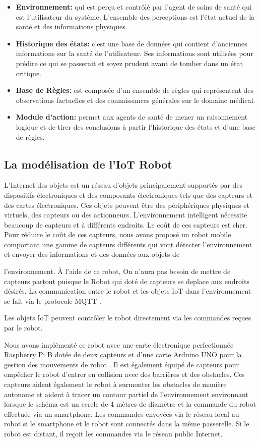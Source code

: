 \begin{itemize}
    \item \textbf{ Environnement:} qui est perçu et contrôlé par l'agent de soins de santé qui est l'utilisateur du système. L'ensemble des perceptions est l'état actuel de la santé et des informations physiques.
    \item \textbf{Historique des états:} c'est une base de données qui contient d'anciennes informations sur la santé de l'utilisateur. Ses informations sont utilisées pour prédire ce qui se passerait et soyez prudent avant de tomber dans un état critique.
    \item \textbf{Base de Règles:} est composée d'un ensemble de règles qui représentent des observations factuelles et  des connaissances générales sur le domaine médical.
    \item \textbf{Module d'action:} permet aux agents de santé de mener un raisonnement logique et de tirer des conclusions à partir l'historique des états  et d'une base de règles.
\end{itemize}
\subsection{La modélisation de l'IoT Robot}
L'Internet des objets\cite{29}\cite{30} est un réseau d'objets principalement supportés par des dispositifs électroniques et des composants électroniques tels que des capteurs et des cartes électroniques. Ces objets peuvent être des périphériques physiques et virtuels, des capteurs ou des actionneurs. L'environnement intelligent nécessite beaucoup de capteurs et à différents endroits. Le coût de ces capteurs est cher. Pour réduire le coût de ces capteurs, nous avons proposé un robot mobile comportant une gamme de capteurs différents qui vont détecter l'environnement et envoyer des informations et des données aux objets de

l'environnement\cite{31}\cite{15}. À l'aide de ce robot, On n'aura pas besoin de mettre de capteurs partout puisque le Robot qui doté de capteurs se deplace aux endroits désirés. La  communication entre le robot et les objets IoT dans l'environnement se fait via le protocole MQTT\cite{32} .


Les objets IoT peuvent contrôler le robot directement via les commandes reçues par le robot. 

Nous avons implémenté ce robot avec une carte électronique perfectionnée Raspberry Pi B dotée de deux capteurs et d’une carte Arduino UNO pour la gestion des mouvements de robot \cite{zouai2019new}. Il est également équipé de capteurs pour empêcher le robot d'entrer en collision avec des barrières et des obstacles. Ces capteurs aident également le robot à surmonter les obstacles de manière autonome et aident à tracer un contour partiel de l'environnement environnant lorsque le schéma est un cercle de 4 mètres de diamètre et la commande du robot effectuée via un smartphone. Les commandes envoyées via le réseau local au robot si le smartphone et le robot sont connectés dans la même passerelle. Si le robot est distant, il reçoit les commandes via le réseau public Internet.


